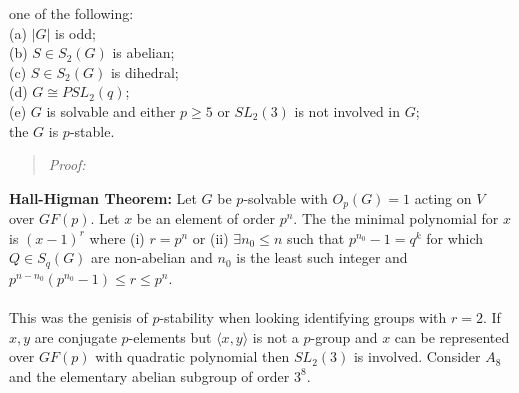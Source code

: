 one of the following:\\
(a) $|G|$ is odd;\\
(b) $S \in S_2(G)$ is abelian;\\
(c) $S \in S_2(G)$ is dihedral;\\
(d) $G \cong PSL_2(q)$;\\
(e)  $G$ is solvable and either $p \geq 5$ or $SL_2(3)$ is not involved in $G$;\\
the $G$ is $p$-stable.
\begin{quote}
\emph{Proof:}
\end{quote}
{\bf Hall-Higman Theorem:} Let $G$ be $p$-solvable with $O_p(G)=1$ acting on $V$ over $GF(p)$.
Let $x$ be an element of order $p^n$. The the minimal polynomial for $x$ is $(x-1)^r$ where
(i) $r=p^n$ or (ii) $\exists n_0 \leq n$ such that $p^{n_0}-1= q^k$ for which $Q \in S_q(G)$
are non-abelian and $n_0$ is the least such integer and $p^{n-n_0}(p^{n_0}-1) \leq r \leq p^n$.
\\
\\
This was the genisis of $p$-stability when looking identifying groups with $r=2$.  If $x, y$
are conjugate $p$-elements but $\langle x, y \rangle$ is not a $p$-group and $x$ can be represented
over $GF(p)$ with quadratic polynomial then $SL_2(3)$ is involved.  Consider $A_8$ and the
elementary abelian subgroup of order $3^8$.
